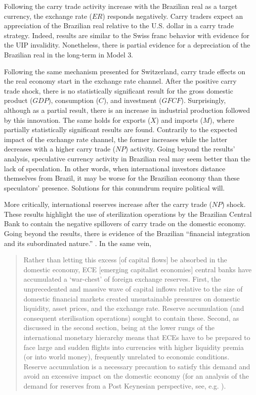\documentclass[a4paper, twoside]{templates/ociamthesis}
\begin{document}
Following the carry trade activity increase with the Brazilian real as a target currency, the exchange rate (\(ER\)) responds negatively. Carry traders expect an appreciation of the Brazilian real relative to the U.S. dollar in a carry trade strategy. Indeed, results are similar to the Swiss franc behavior with evidence for the UIP invalidity. Nonetheless, there is partial evidence for a depreciation of the Brazilian real in the long-term in Model 3.

Following the same mechanism presented for Switzerland, carry trade effects on the real economy start in the exchange rate channel. After the positive carry trade shock, there is no statistically significant result for the gross domestic product (\(GDP\)), consumption (\(C\)), and investment (\(GFCF\)). Surprisingly, although as a partial result, there is an increase in industrial production followed by this innovation. The same holds for exports (\(X\)) and imports (\(M\)), where partially statistically significant results are found. Contrarily to the expected impact of the exchange rate channel, the former increases while the latter decreases with a higher carry trade (\(NP\)) activity. Going beyond the results' analysis, speculative currency activity in Brazilian real may seem better than the lack of speculation. In other words, when international investors distance themselves from Brazil, it may be worse for the Brazilian economy than these speculators' presence. Solutions for this conundrum require political will.

More critically, international reserves increase after the carry trade (\(NP\)) shock. These results highlight the use of sterilization operations by the Brazilian Central Bank to contain the negative spillovers of carry trade on the domestic economy. Going beyond the results, there is evidence of the Brazilian ``financial integration and its subordinated nature.'' \autocite[ 297]{kaltenbrunner2018a}. In the same vein,

\begin{quote}
Rather than letting this excess {[}of capital flows{]} be absorbed in the domestic economy, ECE {[}emerging capitalist economies{]} central banks have accumulated a `war-chest' of foreign exchange reserves. First, the unprecedented and massive wave of capital inflows relative to the size of domestic financial markets created unsustainable pressures on domestic liquidity, asset prices, and the exchange rate. Reserve accumulation (and consequent sterilisation operations) sought to contain these. Second, as discussed in the second section, being at the lower rungs of the international monetary hierarchy means that ECEs have to be prepared to face large and sudden flights into currencies with higher liquidity premia (or into world money), frequently unrelated to economic conditions. Reserve accumulation is a necessary precaution to satisfy this demand and avoid an excessive impact on the domestic economy (for an analysis of the demand for reserves from a Post Keynesian perspective, see, e.g. \textcite{carvalho2009a}). \autocite[ 297]{kaltenbrunner2018a}
\end{quote}
\end{document}
